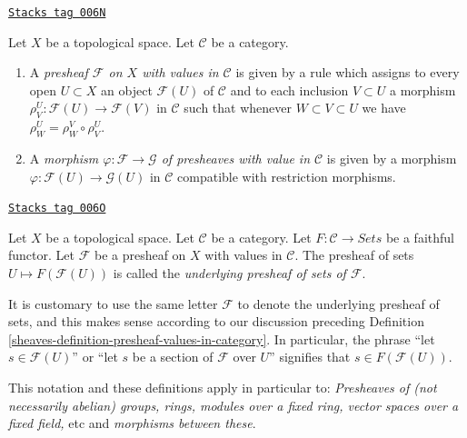 \begin{definition}
\label{sheaves-definition-presheaf-values-in-category}
\href{https://stacks.math.columbia.edu/tag/006N}{\texttt{Stacks tag 006N}}

Let $X$ be a topological space.
Let $\mathcal{C}$ be a category.
\begin{enumerate}
\item A {\it presheaf $\mathcal{F}$ on $X$ with values in $\mathcal{C}$}
is given by a rule which assigns to every open $U \subset X$
an object $\mathcal{F}(U)$ of $\mathcal{C}$
and to each inclusion $V \subset U$
a morphism $\rho_V^U : \mathcal{F}(U) \to \mathcal{F}(V)$
in $\mathcal{C}$ such that whenever $W \subset V \subset U$
we have $\rho_W^U = \rho_W^V \circ \rho_V^U$.
\item A {\it morphism $\varphi : \mathcal{F} \to \mathcal{G}$
of presheaves with value in $\mathcal{C}$} is given by a
morphism $\varphi : \mathcal{F}(U) \to \mathcal{G}(U)$
in $\mathcal{C}$ compatible with restriction morphisms.
\end{enumerate}
\end{definition}

\begin{definition}
\label{sheaves-definition-underlying-presheaf-sets}
\href{https://stacks.math.columbia.edu/tag/006O}{\texttt{Stacks tag 006O}}

Let $X$ be a topological space. Let $\mathcal{C}$ be a category.
Let $F : \mathcal{C} \to \textit{Sets}$ be a faithful functor.
Let $\mathcal{F}$ be a presheaf on $X$ with values in $\mathcal{C}$.
The presheaf of sets $U \mapsto F(\mathcal{F}(U))$
is called the {\it underlying presheaf of sets of $\mathcal{F}$}.
\end{definition}

It is customary to use the same letter $\mathcal{F}$ to denote
the underlying presheaf of sets, and this makes
sense according to our discussion preceding
Definition \ref{sheaves-definition-presheaf-values-in-category}.
In particular, the phrase ``let $s \in \mathcal{F}(U)$''
or ``let $s$ be a section of $\mathcal{F}$ over $U$'' signifies
that $s \in F(\mathcal{F}(U))$.

\medskip\noindent
This notation and these definitions apply in particular to:
{\it Presheaves of (not necessarily abelian) groups, rings, modules
over a fixed ring, vector spaces over a fixed field, } etc and
{\it morphisms between these}.

